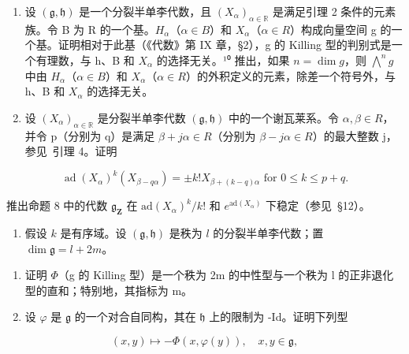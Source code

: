 \begin{enumerate}
\def\labelenumi{\arabic{enumi})}
\setcounter{enumi}{4}
\item
  设 \((\mathfrak{g},\mathfrak{h})\) 是一个分裂半单李代数，且 \((X_{\alpha})_{\alpha\in\mathbb{R}}\) 是满足引理 2 条件的元素族。令 B 为 R 的一个基。\(H_{\alpha}\)（\(\alpha\in B\)）和 \(X_{\alpha}\)（\(\alpha\in R\)）构成向量空间 g 的一个基。证明相对于此基（《代数》第 IX 章，§2），g 的 Killing 型的判别式是一个有理数，与 h、B 和 \(X_{\alpha}\) 的选择无关。¹⁰ 推出，如果 \(n=\dim g\)，则 \(\bigwedge^{n}g\) 中由 \(H_{\alpha}\)（\(\alpha\in B\)）和 \(X_{\alpha}\)（\(\alpha\in R\)）的外积定义的元素，除差一个符号外，与 h、B 和 \(X_{\alpha}\) 的选择无关。

  \item
  设 \((X_{\alpha})_{\alpha\in\mathbb{R}}\) 是分裂半单李代数 \((\mathfrak{g},\mathfrak{h})\) 中的一个谢瓦莱系。令 \(\alpha,\beta\in R\)，并令 p（分别为 q）是满足 \(\beta+j\alpha\in R\)（分别为 \(\beta-j\alpha\in R\)）的最大整数 j，参见~引理 4。证明
\end{enumerate}

\[
\operatorname{ad} (X _ {\alpha}) ^ {k} (X _ {\beta - q \alpha}) = \pm k! X _ {\beta + (k - q) \alpha} \text { for } 0 \leq k \leq p + q.
\]

推出命题 8 中的代数 \(\mathfrak{g}_{\mathbf{Z}}\) 在 \(\mathrm{ad}(X_{\alpha})^k / k!\) 和 \(e^{\mathrm{ad}(X_{\alpha})}\) 下稳定（参见~§12）。

\begin{enumerate}
\def\labelenumi{\arabic{enumi})}
\setcounter{enumi}{6}
\tightlist
\item
  假设 \(k\) 是有序域。设 \((\mathfrak{g},\mathfrak{h})\) 是秩为 \(l\) 的分裂半单李代数；置 \(\dim \mathfrak{g} = l + 2m\)。
\end{enumerate}

\begin{enumerate}
\def\labelenumi{\alph{enumi})}
\item
  证明 \(\varPhi\)（g 的 Killing 型）是一个秩为 2m 的中性型与一个秩为 l 的正非退化型的直和；特别地，其指标为 m。
\item
  设 \(\varphi\) 是 \(\mathfrak{g}\) 的一个对合自同构，其在 \(\mathfrak{h}\) 上的限制为 -Id。证明下列型
\end{enumerate}

\[
(x, y) \mapsto - \Phi (x, \varphi (y)), \quad x, y \in \mathfrak {g},
\]

